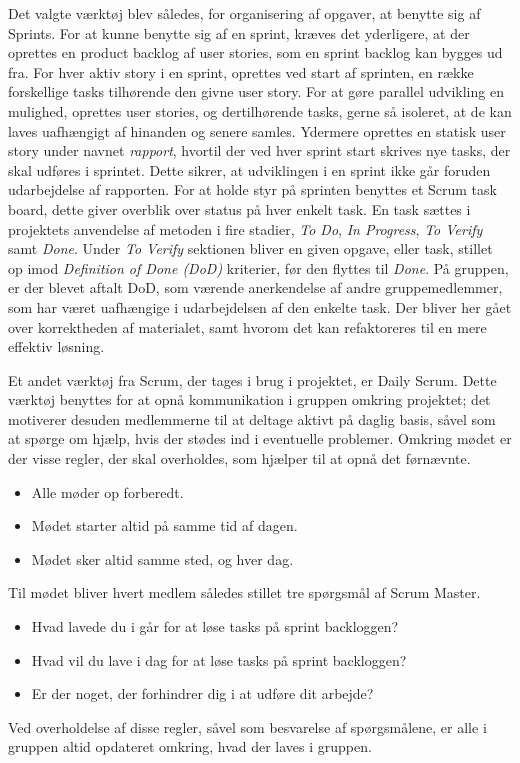 Det valgte værktøj blev således, for organisering af opgaver, at benytte sig af Sprints.
For at kunne benytte sig af en sprint, kræves det yderligere, at der oprettes en product backlog af user stories, som en sprint backlog kan bygges ud fra.
For hver aktiv story i en sprint, oprettes ved start af sprinten, en række forskellige tasks tilhørende den givne user story.
For at gøre parallel udvikling en mulighed, oprettes user stories, og dertilhørende tasks, gerne så isoleret, at de kan laves uafhængigt af hinanden og senere samles.
Ydermere oprettes en statisk user story under navnet \textit{rapport}, hvortil der ved hver sprint start skrives nye tasks, der skal udføres i sprintet. 
Dette sikrer, at udviklingen i en sprint ikke går foruden udarbejdelse af rapporten.
For at holde styr på sprinten benyttes et Scrum task board, dette giver overblik over status på hver enkelt task.
En task sættes i projektets anvendelse af metoden i fire stadier, \textit{To Do}, \textit{In Progress}, \textit{To Verify} samt \textit{Done}.
Under \textit{To Verify} sektionen bliver en given opgave, eller task, stillet op imod \textit{Definition of Done (DoD)} kriterier, før den flyttes til \textit{Done}.
På gruppen, er der blevet aftalt DoD, som værende anerkendelse af andre gruppemedlemmer, som har været uafhængige i udarbejdelsen af den enkelte task.
Der bliver her gået over korrektheden af materialet, samt hvorom det kan refaktoreres til en mere effektiv løsning.

Et andet værktøj fra Scrum, der tages i brug i projektet, er Daily Scrum.
Dette værktøj benyttes for at opnå kommunikation i gruppen omkring projektet; det motiverer desuden medlemmerne til at deltage aktivt på daglig basis, såvel som at spørge om hjælp, hvis der stødes ind i eventuelle problemer.
Omkring mødet er der visse regler, der skal overholdes, som hjælper til at opnå det førnævnte.
\begin{itemize}[nolistsep,noitemsep]
  \item Alle møder op forberedt.
  \item Mødet starter altid på samme tid af dagen.
  \item Mødet sker altid samme sted, og hver dag.
\end{itemize}
Til mødet bliver hvert medlem således stillet tre spørgsmål af Scrum Master.
\begin{itemize}[nolistsep,noitemsep]
  \item Hvad lavede du i går for at løse tasks på sprint backloggen?
  \item Hvad vil du lave i dag for at løse tasks på sprint backloggen?
  \item Er der noget, der forhindrer dig i at udføre dit arbejde?
\end{itemize}
Ved overholdelse af disse regler, såvel som besvarelse af spørgsmålene, er alle i gruppen altid opdateret omkring, hvad der laves i gruppen.

